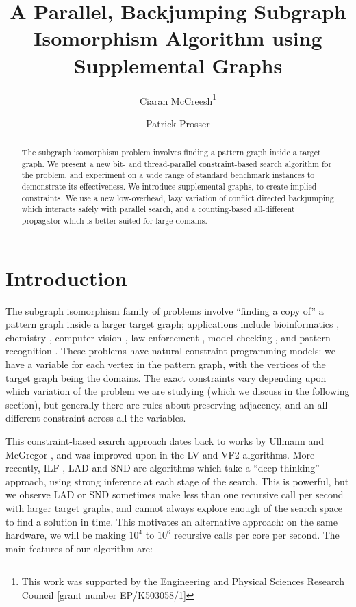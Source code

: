 \documentclass{llncs}
\title{A Parallel, Backjumping Subgraph Isomorphism Algorithm using Supplemental Graphs}
\author{Ciaran McCreesh\thanks{This work was supported by the Engineering and Physical Sciences
Research Council [grant number EP/K503058/1]} \and Patrick Prosser}
\institute{University of Glasgow, Glasgow, Scotland \\ \email{c.mccreesh.1@research.gla.ac.uk}, \\
    \email{patrick.prosser@glasgow.ac.uk}}
\begin{document}
\maketitle

\begin{abstract}
    The subgraph isomorphism problem involves finding a pattern graph inside a target graph.  We
    present a new bit- and thread-parallel constraint-based search algorithm for the problem, and
    experiment on a wide range of standard benchmark instances to demonstrate its effectiveness.  We
    introduce supplemental graphs, to create implied constraints. We use a new low-overhead, lazy
    variation of conflict directed backjumping which interacts safely with parallel search, and a
    counting-based all-different propagator which is better suited for large domains.
\end{abstract}

\section{Introduction}

The subgraph isomorphism family of problems involve ``finding a copy of'' a pattern graph inside a
larger target graph; applications include bioinformatics \cite{Bonnici:2013}, chemistry
\cite{Regin:1995}, computer vision \cite{Damiand:2011,Solnon:2015}, law enforcement
\cite{Coffman:2004}, model checking \cite{Sevegnani:2015}, and pattern recognition
\cite{Conte:2004}.  These problems have natural constraint programming models: we have a variable
for each vertex in the pattern graph, with the vertices of the target graph being the domains. The
exact constraints vary depending upon which variation of the problem we are studying (which we
discuss in the following section), but generally there are rules about preserving adjacency, and an
all-different constraint across all the variables.

This constraint-based search approach dates back to works by Ullmann \cite{Ullmann:1976} and
McGregor \cite{McGregor:1979}, and was improved upon in the LV \cite{Larrosa:2002} and VF2
\cite{Cordella:2004} algorithms.  More recently, ILF \cite{Zampelli:2010}, LAD \cite{Solnon:2010}
and SND \cite{Audemard:2014} are algorithms which take a ``deep thinking'' approach, using strong
inference at each stage of the search.  This is powerful, but we observe LAD or SND sometimes make
less than one recursive call per second with larger target graphs, and cannot always explore enough
of the search space to find a solution in time. This motivates an alternative approach: on the same
hardware, we will be making $10^4$ to $10^6$ recursive calls per core per second.  The main features
of our algorithm are:
\end{document}
